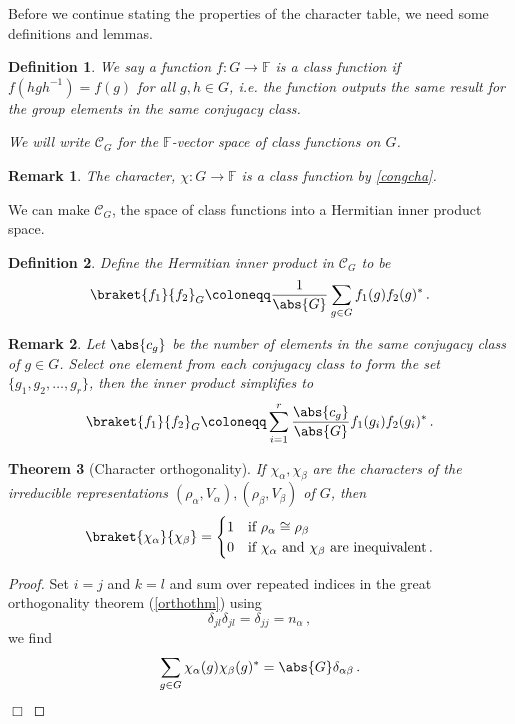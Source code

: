 \documentclass{article}
\theoremstyle{plain}\theoremheaderfont{\normalfont\itshape}\theorembodyfont{\rmfamily}\theoremseparator{.}\newtheorem*{rem}{Remark}\newtheorem*{ex}{Example}\newtheorem*{proof}{Proof}\newtheorem*{altp}{Alternative proof}
\theoremstyle{plain}\theoremheaderfont{\normalfont\bfseries}\theorembodyfont{\rmfamily}\theoremseparator{.}\newtheorem{thm}{Theorem}[section]\newtheorem{lem}[thm]{Lemma}\newtheorem{prop}[thm]{Proposition}\newtheorem*{cor}{Corollary}\newtheorem{defn}[thm]{Definition}\newtheorem{clm}[thm]{Claim}\newtheorem{clminproof}{Claim}
\theoremstyle{break}\theoremheaderfont{\normalfont\itshape}\theorembodyfont{\rmfamily}\theoremseparator{.\medskip}\newtheorem*{proofskip}{Proof}\newtheorem*{exs}{Examples}\newtheorem*{rems}{Remarks}
\theoremstyle{break}\theoremheaderfont{\normalfont\bfseries}\theorembodyfont{\rmfamily}\theoremseparator{.\medskip}\newtheorem{lemskip}[thm]{Lemma}\newtheorem{defnskip}[thm]{Definition}\newtheorem{propskip}[thm]{Proposition}\newtheorem{thmskip}[thm]{Theorem}
\numberwithin{equation}{section}
\newcommand{\qed}{\hfill\ensuremath{\Box}}
\begin{document}
	Before we continue stating the properties of the character table, we need some definitions and lemmas.
	\begin{defn}
		We say a function \(f:G\to\mathbb{F}\) is a \textit{class function} if \(f(hgh^{-1})=f(g)\) for all \(g,h\in G\), i.e. the function outputs the same result for the group elements in the same conjugacy class.
		
		We will write \(\mathcal{C}_G\) for the \(\mathbb{F}\)-vector space of class functions on \(G\).
	\end{defn}
	\begin{rem}
		The character, \(\chi:G\to\mathbb{F}\) is a class function by \cref{congcha}.
	\end{rem}
	We can make \(\mathcal{C}_G\), the space of class functions into a Hermitian inner product space.
	\begin{defn}
		Define the \textit{Hermitian inner product in \(\mathcal{C}_G\)} to be
		\[\braket{f_1}{f_2}_G\coloneqq\frac{1}{\abs{G}}\sum_{g\in G}f_1(g)f_2(g)^*\,.\]
	\end{defn}
	\begin{rem}
		Let \(\abs{c_g}\) be the number of elements in the same conjugacy class of \(g\in G\). Select one element from each conjugacy class to form the set \(\{g_1,g_2,\dots,g_r\}\), then the inner product simplifies to
		\[\braket{f_1}{f_2}_G\coloneqq\sum_{i=1}^r\frac{\abs{c_g}}{\abs{G}}f_1(g_i)f_2(g_i)^*\,.\]
	\end{rem}
	\begin{thm}[Character orthogonality]\label{charortho}
		If \(\chi_\alpha,\chi_\beta\) are the characters of the irreducible representations \((\rho_\alpha,V_\alpha),(\rho_\beta,V_\beta)\) of \(G\), then
		\[\braket{\chi_\alpha}{\chi_\beta}=\begin{cases}
			1 & \text{if }\rho_\alpha\cong\rho_\beta\\
			0 & \text{if }\chi_\alpha\text{ and }\chi_\beta\text{ are inequivalent}\,.
		\end{cases}\]
	\end{thm}
	\begin{proof}
		Set \(i=j\) and \(k=l\) and sum over repeated indices in the great orthogonality theorem (\cref{orthothm}) using
		\[\delta_{jl}\delta_{jl}=\delta_{jj}=n_\alpha\,,\]
		we find
		\[\sum_{g\in G}\chi_\alpha(g)\chi_\beta(g)^*=\abs{G}\delta_{\alpha\beta}\,.\]
		\qed
	\end{proof}
	
\end{document}
